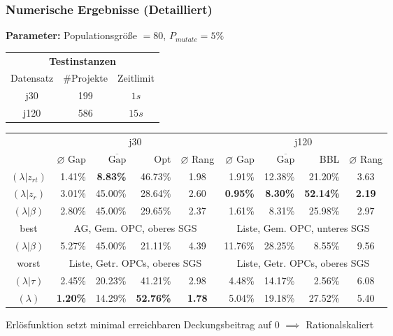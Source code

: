 \begin{frame}[noframenumbering]
	\frametitle{Numerische Ergebnisse (Detailliert)}
	\begin{footnotesize}
		\textbf{Parameter:} Populationsgröße $=80$, $P_{mutate}=5\%$\\
		
		\begin{center}
			\begin{tabular}{ccc}
				\multicolumn{3}{c}{\textbf{Testinstanzen}}\\
				Datensatz & \#Projekte & Zeitlimit\\
				j30 & 199 & $1s$\\
				j120 & 586 & $15s$
			\end{tabular}
		\end{center}
		
		\begin{center}	
			\tabcolsep=0.16cm
			\begin{tabular}{|c|rrrc|rrrc|}
				\hline
				& \multicolumn{4}{c|}{j30} & \multicolumn{4}{c|}{j120}\\
				& $\varnothing$ Gap & $\overline{\mbox{Gap}}$ & Opt & $\varnothing$ Rang & $\varnothing$ Gap & $\overline{\mbox{Gap}}$ & BBL & $\varnothing$ Rang \\[3pt]
				\hline
				$(\lambda|z_{rt})$&1.41\%&\textbf{8.83\%}&46.73\%&1.98&1.91\%&12.38\%&21.20\%&3.63\\
				\hline
				$(\lambda|z_r)$&3.01\%&45.00\%&28.64\%&2.60&\textbf{0.95\%}&\textbf{8.30\%}&\textbf{52.14\%}&\textbf{2.19}\\
				\hline
				$(\lambda|\beta)$&2.80\%&45.00\%&29.65\%&2.37&1.61\%&8.31\%&25.98\%&2.97\\
				best & \multicolumn{4}{c|}{AG, Gem. OPC, oberes SGS} & \multicolumn{4}{c|}{Liste, Gem. OPC, unteres SGS}\\
				\hline
				$(\lambda|\beta)$&5.27\%&45.00\%&21.11\%&4.39&11.76\%&28.25\%&8.55\%&9.56\\
				worst & \multicolumn{4}{c|}{Liste, Getr. OPCs, oberes SGS} & \multicolumn{4}{c|}{Liste, Getr. OPCs, oberes SGS}\\
				\hline
				$(\lambda|\tau)$&2.45\%&20.23\%&41.21\%&2.98&4.48\%&14.17\%&2.56\%&6.08\\
				\hline
				$(\lambda)$& \textbf{1.20\%}&14.29\%&\textbf{52.76\%}&\textbf{1.78}&5.04\%&19.18\%&27.52\%&5.40\\
				\hline
			\end{tabular}
		\end{center}
		
		Erlösfunktion setzt minimal erreichbaren Deckungsbeitrag auf 0 $\implies$ Rationalskaliert
		
	\end{footnotesize}	
	
\end{frame}

